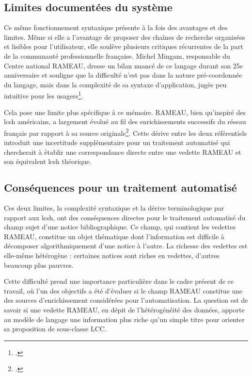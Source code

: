 \subsection{Limites documentées du système}
\label{sec:rameau-limites}

Ce même fonctionnement syntaxique présente à la fois des avantages et des limites. Même si elle a l'avantage de proposer des chaînes de recherche organisées et lisibles pour l'utilisateur, elle soulève plusieurs critiques récurrentes de la part de la communauté professionnelle française. Michel Mingam, responsable du Centre national RAMEAU, dresse un bilan nuancé de ce langage durant son 25e anniversaire et souligne que la difficulté n'est pas dans la nature pré-coordonnée du langage, mais dans la complexité de sa syntaxe d'application, jugée peu intuitive pour les usagers\footcite{mingam2005}. 


Cela pose une limite plus spécifique à ce mémoire. RAMEAU, bien qu'inspiré des \gls{lcsh} américains, a largement évolué au fil des enrichissements successifs du réseau français par rapport à sa source originale\footcite[p.~41]{mingam2005}. Cette dérive entre les deux référentiels introduit une incertitude supplémentaire pour un traitement automatisé qui chercherait à établir une correspondance directe entre une vedette RAMEAU et son équivalent \gls{lcsh} théorique.


\subsection{Conséquences pour un traitement automatisé}
\label{sec:rameau-consequences}

Ces deux limites, la complexité syntaxique et la dérive terminologique par rapport aux \gls{lcsh}, ont des conséquences directes pour le traitement automatisé du champ sujet d'une notice bibliographique. Ce champ, qui contient les vedettes RAMEAU, constitue un objet thématique dont l'information est difficile à décomposer algorithmiquement d'une notice à l'autre. La richesse des vedettes est elle-même hétérogène : certaines notices sont riches en vedettes, d'autres beaucoup plus pauvres.

Cette difficulté prend une importance particulière dans le cadre présent de ce travail, où l'un des objectifs a été d'évaluer si le champ RAMEAU constitue une des sources d'enrichissement considérées pour l'automatisation. La question est de savoir si une vedette RAMEAU, en dépit de l'hétérogénéité des données, apporte au modèle de langage une information plus riche qu'un simple titre pour orienter sa proposition de sous-classe LCC. 

